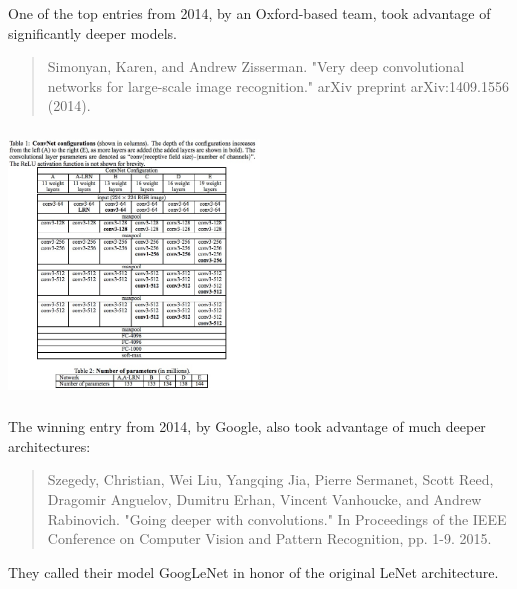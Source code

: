 \documentclass[xetex,mathserif,serif,aspectratio=169]{beamer}
\begin{document}
\begin{frame}[fragile] \frametitle{} \oldB \small


One of the top entries from 2014, by an Oxford-based team, took
advantage of significantly deeper models.
\begin{quote}
Simonyan, Karen, and Andrew Zisserman. "Very deep convolutional networks for large-scale image recognition." arXiv preprint arXiv:1409.1556 (2014).
\end{quote}

\end{frame}

\begin{frame}[fragile] \frametitle{} \oldB \small

\begin{center}
\includegraphics[width=0.5\textwidth]{img/vggModel.jpg}
\end{center}

\end{frame}

\begin{frame}[fragile] \frametitle{} \oldB \small

\textbf{}

\end{frame}

\begin{frame}[fragile] \frametitle{} \oldB \small


The winning entry from 2014, by Google, also took advantage
of much deeper architectures:
\begin{quote}
Szegedy, Christian, Wei Liu, Yangqing Jia, Pierre Sermanet, Scott Reed, Dragomir Anguelov, Dumitru Erhan, Vincent Vanhoucke, and Andrew Rabinovich. "Going deeper with convolutions." In Proceedings of the IEEE Conference on Computer Vision and Pattern Recognition, pp. 1-9. 2015.
\end{quote}
They called their model GoogLeNet in honor of the original LeNet
architecture.

\end{frame}
\end{document}
